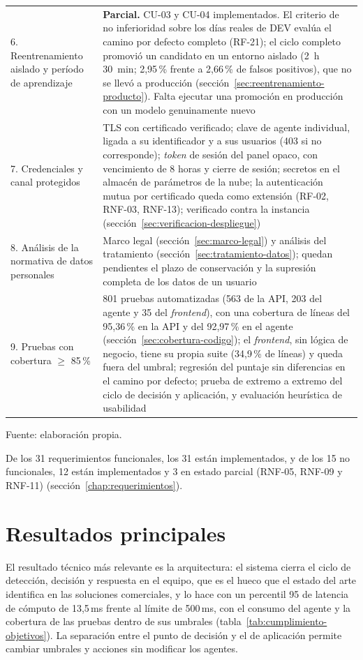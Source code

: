 \begin{longtable}{p{5.0cm}p{9.0cm}}
6. Reentrenamiento aislado y período de aprendizaje & \textbf{Parcial.} CU-03 y CU-04 implementados. El criterio de no inferioridad sobre los días reales de DEV evalúa el camino por defecto completo (RF-21); el ciclo completo promovió un candidato en un entorno aislado (2~h 30~min; 2,95\,\% frente a 2,66\,\% de falsos positivos), que no se llevó a producción (sección~\ref{sec:reentrenamiento-producto}). Falta ejecutar una promoción en producción con un modelo genuinamente nuevo \\
7. Credenciales y canal protegidos & TLS con certificado verificado; clave de agente individual, ligada a su identificador y a sus usuarios (403 si no corresponde); \emph{token} de sesión del panel opaco, con vencimiento de 8 horas y cierre de sesión; secretos en el almacén de parámetros de la nube; la autenticación mutua por certificado queda como extensión (RF-02, RNF-03, RNF-13); verificado contra la instancia (sección~\ref{sec:verificacion-despliegue}) \\
8. Análisis de la normativa de datos personales & Marco legal (sección~\ref{sec:marco-legal}) y análisis del tratamiento (sección~\ref{sec:tratamiento-datos}); quedan pendientes el plazo de conservación y la supresión completa de los datos de un usuario \\
9. Pruebas con cobertura $\geq$ 85\,\% & 801 pruebas automatizadas (563 de la API, 203 del agente y 35 del \emph{frontend}), con una cobertura de líneas del 95,36\,\% en la API y del 92,97\,\% en el agente (sección~\ref{sec:cobertura-codigo}); el \emph{frontend}, sin lógica de negocio, tiene su propia suite (34,9\,\% de líneas) y queda fuera del umbral; regresión del puntaje sin diferencias en el camino por defecto; prueba de extremo a extremo del ciclo de decisión y aplicación, y evaluación heurística de usabilidad \\
\hline
\end{longtable}
{\small Fuente: elaboración propia.\par}

De los 31 requerimientos funcionales, los 31 están implementados, y de los 15 no
funcionales, 12 están implementados y 3 en estado parcial (RNF-05, RNF-09 y RNF-11) (sección~\ref{chap:requerimientos}).

\section{Resultados principales}
El resultado técnico más relevante es la arquitectura: el sistema cierra el ciclo de detección,
decisión y respuesta en el equipo, que es el hueco que el estado del arte identifica en las
soluciones comerciales, y lo hace con un percentil 95 de latencia de cómputo de 13,5\,ms frente al límite de 500\,ms, con el consumo del agente y la cobertura de las pruebas dentro de sus umbrales (tabla~\ref{tab:cumplimiento-objetivos}).
 La separación entre el punto de decisión y el de aplicación permite cambiar
umbrales y acciones sin modificar los agentes.

